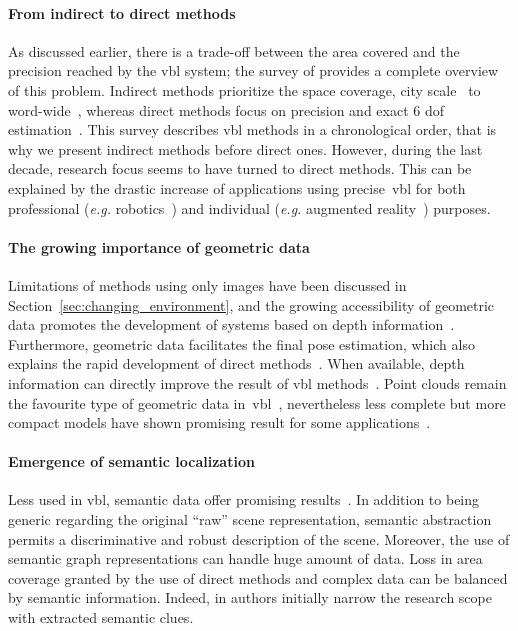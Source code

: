         \paragraph{From indirect to direct methods}
        	As discussed earlier, there is a trade-off between the area covered and the precision reached by the \ac{vbl} system; the survey of \citet{Brejcha2017} provides a complete overview of this problem. Indirect methods prioritize the space coverage, city scale~\citep{Gordo2016} to word-wide~\citep{Weyand2016}, whereas direct methods focus on precision and exact 6 \ac{dof} estimation~\citep{Feng2016a}. This survey describes \ac{vbl} methods in a chronological order, that is why we present indirect methods before direct ones. However, during the last decade, research focus seems to have turned to direct methods. This can be explained by the drastic increase of applications using precise~\ac{vbl} for both professional (\textit{e.g.} robotics~\citep{Majdik2013}) and individual (\textit{e.g.} augmented reality~\citep{Arth2015}) purposes.
        
        \paragraph{The growing importance of geometric data}
        	Limitations of methods using only images have been discussed in Section~\ref{sec:changing_environment}, and the growing accessibility of geometric data promotes the development of systems based on depth information~\citep{Paparoditis2012}. Furthermore, geometric data facilitates the final pose estimation, which also explains the rapid development of direct methods~\citep{Kroeger2014,Pani2015Lmi,Pani2015Robust}. When available, depth information can directly improve the result of \ac{vbl} methods~\citep{Ni2009,Gee2012,Shotton2013,Torii2015,Cavallari}. Point clouds remain the favourite type of geometric data in~\ac{vbl}~\citep{Sattler2016a}, nevertheless less complete but more compact models have shown promising result for some applications~\citep{Ramalingam2010,Bansal2014,Christie2016,Torii2015}.

        \paragraph{Emergence of semantic localization}
        	Less used in \ac{vbl}, semantic data offer promising results~\citep{Ardeshir2014,Castaldo2015,Christie2016}. In addition to being generic regarding the original ``raw'' scene representation, semantic abstraction permits a discriminative and robust description of the scene. Moreover, the use of semantic graph representations can handle huge amount of data. Loss in area coverage granted by the use of direct methods and complex data can be balanced by semantic information. Indeed, in \citep{Ardeshir2014,Lu2015} authors initially narrow the research scope with extracted semantic clues.
        
